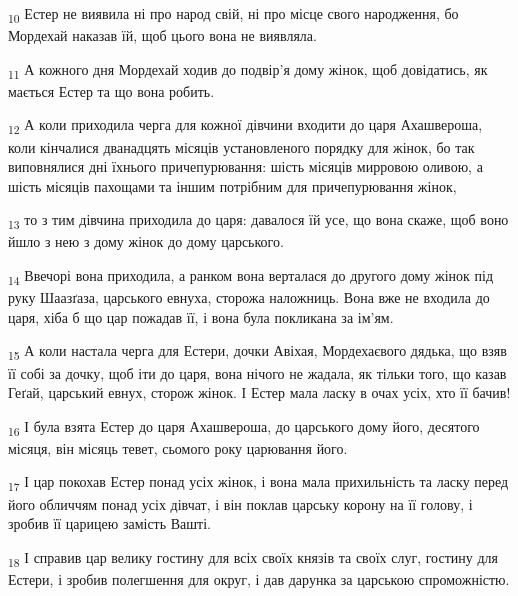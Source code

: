 \begin{tcolorbox}
\textsubscript{10} Естер не виявила ні про народ свій, ні про місце свого народження, бо Мордехай наказав їй, щоб цього вона не виявляла.
\end{tcolorbox}
\begin{tcolorbox}
\textsubscript{11} А кожного дня Мордехай ходив до подвір'я дому жінок, щоб довідатись, як мається Естер та що вона робить.
\end{tcolorbox}
\begin{tcolorbox}
\textsubscript{12} А коли приходила черга для кожної дівчини входити до царя Ахашвероша, коли кінчалися дванадцять місяців установленого порядку для жінок, бо так виповнялися дні їхнього причепурювання: шість місяців мирровою оливою, а шість місяців пахощами та іншим потрібним для причепурювання жінок,
\end{tcolorbox}
\begin{tcolorbox}
\textsubscript{13} то з тим дівчина приходила до царя: давалося їй усе, що вона скаже, щоб воно йшло з нею з дому жінок до дому царського.
\end{tcolorbox}
\begin{tcolorbox}
\textsubscript{14} Ввечорі вона приходила, а ранком вона верталася до другого дому жінок під руку Шаазґаза, царського евнуха, сторожа наложниць. Вона вже не входила до царя, хіба б що цар пожадав її, і вона була покликана за ім'ям.
\end{tcolorbox}
\begin{tcolorbox}
\textsubscript{15} А коли настала черга для Естери, дочки Авіхая, Мордехаєвого дядька, що взяв її собі за дочку, щоб іти до царя, вона нічого не жадала, як тільки того, що казав Геґай, царський евнух, сторож жінок. І Естер мала ласку в очах усіх, хто її бачив!
\end{tcolorbox}
\begin{tcolorbox}
\textsubscript{16} І була взята Естер до царя Ахашвероша, до царського дому його, десятого місяця, він місяць тевет, сьомого року царювання його.
\end{tcolorbox}
\begin{tcolorbox}
\textsubscript{17} І цар покохав Естер понад усіх жінок, і вона мала прихильність та ласку перед його обличчям понад усіх дівчат, і він поклав царську корону на її голову, і зробив її царицею замість Вашті.
\end{tcolorbox}
\begin{tcolorbox}
\textsubscript{18} І справив цар велику гостину для всіх своїх князів та своїх слуг, гостину для Естери, і зробив полегшення для округ, і дав дарунка за царською спроможністю.
\end{tcolorbox}
